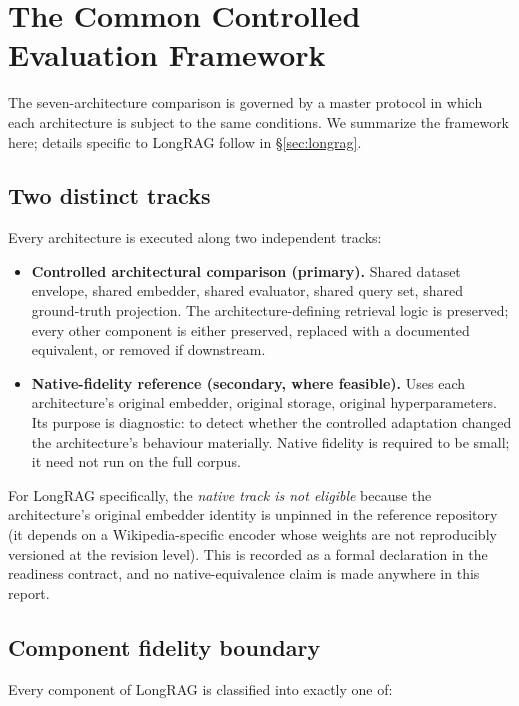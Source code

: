 \documentclass[11pt,a4paper]{article}
\begin{document}
\section{The Common Controlled Evaluation Framework}\label{sec:framework}

The seven-architecture comparison is governed by a master protocol
in which each architecture is subject to the same conditions.
We summarize the framework here; details specific to LongRAG follow
in \S\ref{sec:longrag}.

\subsection{Two distinct tracks}
Every architecture is executed along two independent tracks:

\begin{itemize}[leftmargin=1.5em,itemsep=0.15em]
  \item \textbf{Controlled architectural comparison (primary).}
    Shared dataset envelope, shared embedder, shared evaluator,
    shared query set, shared ground-truth projection. The
    architecture-defining retrieval logic is preserved; every other
    component is either preserved, replaced with a documented
    equivalent, or removed if downstream.
  \item \textbf{Native-fidelity reference (secondary, where
    feasible).} Uses each architecture's original embedder,
    original storage, original hyperparameters. Its purpose is
    diagnostic: to detect whether the controlled adaptation changed
    the architecture's behaviour materially. Native fidelity is
    required to be small; it need not run on the full corpus.
\end{itemize}

For LongRAG specifically, the \emph{native track is not eligible}
because the architecture's original embedder identity is unpinned
in the reference repository (it depends on a Wikipedia-specific
encoder whose weights are not reproducibly versioned at the
revision level). This is recorded as a formal declaration in the
readiness contract, and no native-equivalence claim is made
anywhere in this report.

\subsection{Component fidelity boundary}
Every component of LongRAG is classified into exactly one of:
\end{document}

